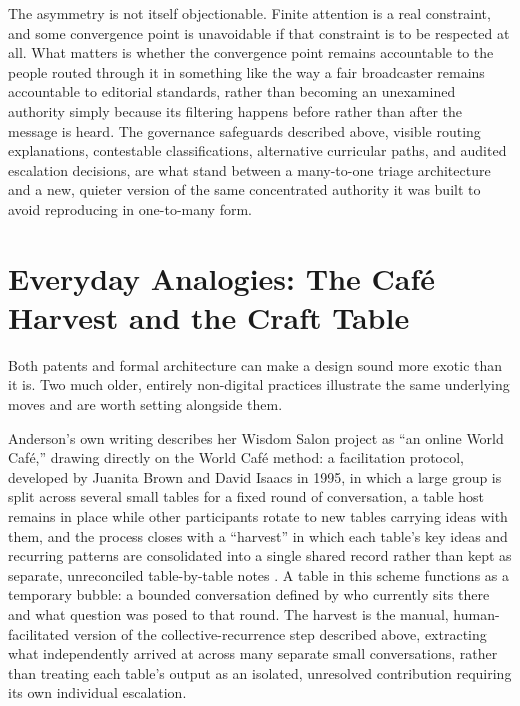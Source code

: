 \documentclass[11pt]{article}
\begin{document}
The asymmetry is not itself objectionable. Finite attention is a real constraint, and some convergence point is unavoidable if that constraint is to be respected at all. What matters is whether the convergence point remains accountable to the people routed through it in something like the way a fair broadcaster remains accountable to editorial standards, rather than becoming an unexamined authority simply because its filtering happens before rather than after the message is heard. The governance safeguards described above, visible routing explanations, contestable classifications, alternative curricular paths, and audited escalation decisions, are what stand between a many-to-one triage architecture and a new, quieter version of the same concentrated authority it was built to avoid reproducing in one-to-many form.

\section{Everyday Analogies: The Café Harvest and the Craft Table}

Both patents and formal architecture can make a design sound more exotic than it is. Two much older, entirely non-digital practices illustrate the same underlying moves and are worth setting alongside them.

Anderson's own writing describes her Wisdom Salon project as ``an online World Café,'' drawing directly on the World Café method: a facilitation protocol, developed by Juanita Brown and David Isaacs in 1995, in which a large group is split across several small tables for a fixed round of conversation, a table host remains in place while other participants rotate to new tables carrying ideas with them, and the process closes with a ``harvest'' in which each table's key ideas and recurring patterns are consolidated into a single shared record rather than kept as separate, unreconciled table-by-table notes \cite{brown2005worldcafe}. A table in this scheme functions as a temporary bubble: a bounded conversation defined by who currently sits there and what question was posed to that round. The harvest is the manual, human-facilitated version of the collective-recurrence step described above, extracting what independently arrived at across many separate small conversations, rather than treating each table's output as an isolated, unresolved contribution requiring its own individual escalation.
\end{document}
